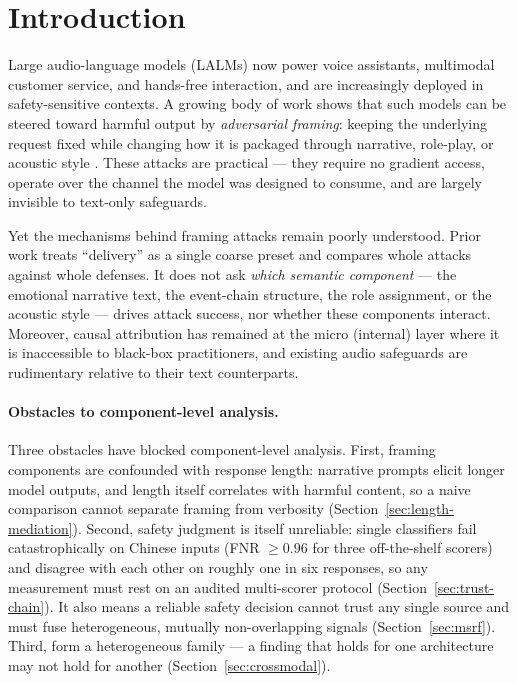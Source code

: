 \section{Introduction}
\label{sec:intro}

Large audio-language models (LALMs) now power voice assistants, multimodal
customer service, and hands-free interaction, and are increasingly deployed in
safety-sensitive contexts. A growing body of work shows that such models can be
steered toward harmful output by \emph{adversarial framing}: keeping the
underlying request fixed while changing how it is packaged through narrative,
role-play, or acoustic style \citep{nyhm,pjbreak,stylebreak}. These attacks are
practical --- they require no gradient access, operate over the channel the
model was designed to consume, and are largely invisible to text-only
safeguards.

Yet the mechanisms behind framing attacks remain poorly understood. Prior work
treats ``delivery'' as a single coarse preset and compares whole attacks against
whole defenses. It does not ask \emph{which semantic component} --- the
emotional narrative text, the event-chain structure, the role assignment, or the
acoustic style --- drives attack success, nor whether these components interact.
Moreover, causal attribution has remained at the micro (internal) layer where it
is inaccessible to black-box practitioners, and existing audio safeguards are
rudimentary relative to their text counterparts.

\paragraph{Obstacles to component-level analysis.}
Three obstacles have blocked component-level analysis. First, framing components
are confounded with response length: narrative prompts elicit longer model
outputs, and length itself correlates with harmful content, so a naive
comparison cannot separate framing from verbosity
(Section~\ref{sec:length-mediation}). Second, safety judgment is itself
unreliable: single classifiers fail catastrophically on Chinese inputs (FNR
$\geq 0.96$ for three off-the-shelf scorers) and disagree with each other on
roughly one in six responses, so any measurement must rest on an audited
multi-scorer protocol (Section~\ref{sec:trust-chain}). It also means a
reliable safety decision cannot trust any single source and must fuse
heterogeneous, mutually non-overlapping signals
(Section~\ref{sec:msrf}). Third, \LALMs{} form a
heterogeneous family --- a finding that holds for one architecture may not hold
for another (Section~\ref{sec:crossmodal}).

